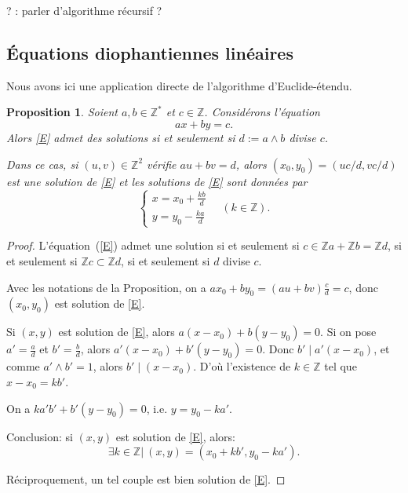 \documentclass[10pt,a4paper]{report}
\newtheorem{Prop}[thm]{Proposition}
\newcommand{\Z}{\mathbb{Z}}
\begin{document}


? : parler d'algorithme récursif ?

\subsection{Équations diophantiennes linéaires}

Nous avons ici une application directe de l'algorithme d'Euclide-étendu.

\begin{Prop}
Soient $a,b \in \mathbb{Z}^*$ et $c \in \mathbb{Z}$. Considérons l'équation
\begin{equation}\label{E}
ax+by=c.
\end{equation}
Alors \eqref{E} admet des solutions si et seulement si $d:=a\wedge b$ divise $c$.\par 
Dans ce cas, si $(u,v) \in \mathbb{Z}^2$ vérifie $au+bv=d$, alors $(x_0,y_0)=(uc/d,vc/d)$ est une solution de \eqref{E} et les solutions de \eqref{E} sont données par 
\begin{equation*}
  \begin{cases} \displaystyle
x=x_0+\frac{kb}{d} \\
\displaystyle y=y_0 - \frac{ka}{d} 
\end{cases}  \quad(k \in \mathbb{Z}).
\end{equation*}
\end{Prop}

\begin{proof}
L'équation~(\ref{E}) admet une solution si et seulement si $c\in \Z a+\Z b=\Z d$, si et seulement si $\Z c\subset \Z d$, si et seulement si $d$ divise $c$. \par 
Avec les notations de la Proposition, on a $ax_0+b y_0= (au+bv)\tfrac{c}{d}=c$, donc $(x_0,y_0)$ est solution de \eqref{E}.\par 
Si $(x,y)$ est solution de \eqref{E}, alors $a(x-x_0)+b(y-y_0)=0$. Si on pose $a'=\frac{a}{d}$ et $b'=\frac{b}{d}$, alors $a'(x-x_0)+b'(y-y_0)=0$. Donc $b' \mid a'(x-x_0)$, et comme $a'\wedge b'=1$, alors $b' \mid (x-x_0)$. D'où l'existence de $k \in \mathbb{Z}$ tel que  $x-x_0=kb'$.\par 
On a $ka'b'+b'(y-y_0)=0$, i.e. $y=y_0-ka'$. \par 
Conclusion: si $(x,y)$ est solution de \eqref{E}, alors: \[\exists k \in \mathbb{Z}|\ (x,y)=(x_0+kb',y_0-ka').\] 

 
Réciproquement, un tel couple est bien solution de \eqref{E}.
\end{proof}
\end{document}
